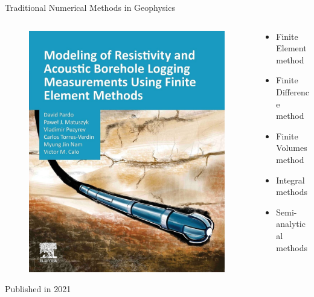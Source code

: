 \begin{frame}{Traditional Numerical Methods in Geophysics}
\begin{columns}
\begin{column}{0.5\textwidth}
	\begin{figure}
	\includegraphics[scale=0.13]{Diapos/Intro/Figures/PardoBook.jpg}
	\end{figure}
	\hspace{0.9cm} {\small Published in 2021}
\end{column}
%
\begin{column}{0.5\textwidth}
\begin{itemize}
\item Finite Element method
\vspace{0.5cm}
\item Finite Difference method
\vspace{0.5cm}
\item Finite Volumes method
\vspace{0.5cm}
\item Integral methods
\vspace{0.5cm}
\item Semi-analytical methods
\end{itemize}
\end{column}
\end{columns}
\end{frame}

